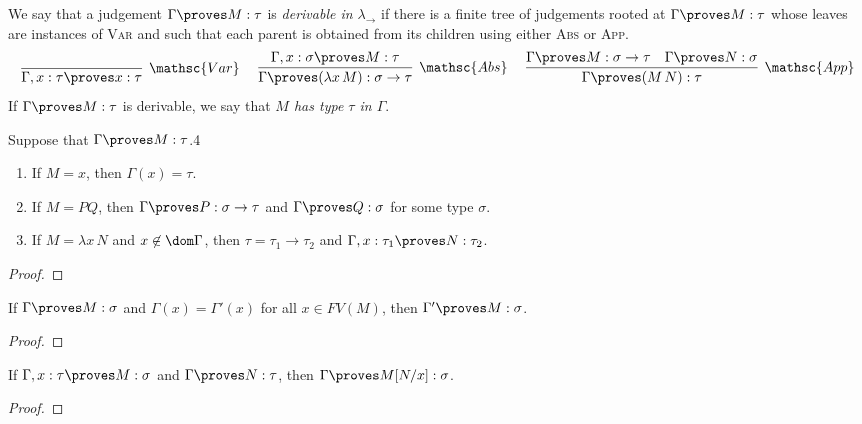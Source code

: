 \documentclass[reqno]{amsart}
\begin{document}
    \begin{definition}
        We say that a judgement $\Gamma\proves M:\tau$ is \textit{derivable in $\lambda_\rightarrow$} if there is a finite tree of judgements rooted at $\Gamma\proves M:\tau$ whose leaves are instances of \textsc{Var} and such that each parent is obtained from its children using either \textsc{Abs} or \textsc{App}.
        \begin{equation*}
            \infer[\mathsc{Var}]{\Gamma,x:\tau\proves x:\tau}{}\ \ \ \ 
            \infer[\mathsc{Abs}]{\Gamma\proves(\lambda x\,M):\sigma\rightarrow\tau}{\Gamma,x:\sigma\proves M:\tau}\ \ \ \ 
            \infer[\mathsc{App}]{\Gamma\proves(M\,N):\tau}{
                \Gamma\proves M:\sigma\rightarrow\tau &
                \Gamma\proves N:\sigma
            }
        \end{equation*}
        If $\Gamma\proves M:\tau$ is derivable, we say that \textit{$M$ has type $\tau$ in $\Gamma$}.
    \end{definition}

    \begin{lemma}
        Suppose that $\Gamma\proves M:\tau$.4
        \begin{enumerate}
            \item If $M=x$, then $\Gamma(x)=\tau$.
            \item If $M=PQ$, then $\Gamma\proves P:\sigma\rightarrow\tau$ and $\Gamma\proves Q:\sigma$ for some type $\sigma$.
            \item If $M=\lambda x\,N$ and $x\not\in\dom\Gamma$, then $\tau=\tau_1\rightarrow\tau_2$ and $\Gamma,x:\tau_1\proves N:\tau_2$.
        \end{enumerate}
    \end{lemma}
    \begin{proof}
        
    \end{proof}

    \begin{lemma}
        If $\Gamma\proves M:\sigma$ and $\Gamma(x)=\Gamma'(x)$ for all $x\in FV(M)$, then $\Gamma'\proves M:\sigma$.
    \end{lemma}
    \begin{proof}
        
    \end{proof}

    \begin{lemma}
        If $\Gamma,x:\tau\proves M:\sigma$ and $\Gamma\proves N:\tau$, then $\Gamma\proves M[N/x]:\sigma$.
    \end{lemma}
    \begin{proof}
        
    \end{proof}
\end{document}
